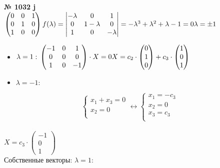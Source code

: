 \documentclass[12pt]{article}
\newenvironment{task}[1][0]{\vspace{.5cm} {\textbf{№ #1} \vspace{.5cm}\\ }}{\\}
\begin{document}
\begin{task}[1032 j]
$
	\begin{pmatrix}
		0 & 0 & 1\\
		0 & 1 & 0\\
		1 & 0 & 0\\
	\end{pmatrix}\\
f(\lambda) = 
\begin{vmatrix}
	-\lambda & 0 & 1\\
	0 & 1-\lambda & 0\\
	1 & 0 & -\lambda\\
\end{vmatrix} = -\lambda^3+\lambda^2+\lambda-1=0\\
\lambda = \pm1\\$
\begin{itemize}
	\item {
	$\lambda = 1:\\
	\begin{pmatrix}
		-1 & 0 & 1\\
		0 & 0 & 0\\
		1 & 0 & -1
	\end{pmatrix} \cdot X = 0\\
	X = c_2 \cdot
	\begin{pmatrix}
		0 \\ 1 \\ 0\\
	\end{pmatrix} + c_3 \cdot
	\begin{pmatrix}
		1\\0\\1\\
	\end{pmatrix}\\$
}
\item{$\lambda = -1:$
}
\end{itemize}

{
\begin{equation*}
	\begin{cases}
		x_1+x_3=0\\
		x_2=0\\
	\end{cases} \leftrightarrow
\begin{cases}
	x_1=-c_3\\
	x_2=0\\
	x_3=c_3\\
\end{cases}
\end{equation*}\\
$X = c_3 \cdot
\begin{pmatrix}
	-1\\0\\1
\end{pmatrix}$}\\
Собственные векторы:
$\lambda=1:$
\end{task}
\end{document}
